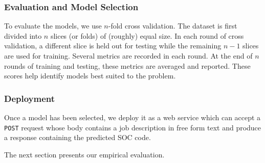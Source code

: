\subsubsection{Evaluation and Model Selection}
To evaluate the models, we use $n$-fold cross validation. The dataset is first divided into $n$ slices (or folds) of (roughly) equal size. In each round of cross validation, a different slice is held out for testing while the remaining $n - 1$ slices are used for training. Several metrics are recorded in each round. At the end of $n$ rounds of training and testing, these metrics are averaged and reported. These scores help identify models best suited to the problem.

\subsubsection{Deployment}
Once a model has been selected, we deploy it as a web service which can accept a \texttt{POST} request whose body contains a job description in free form text and produce a response containing the predicted SOC code.

The next section presents our empirical evaluation.

